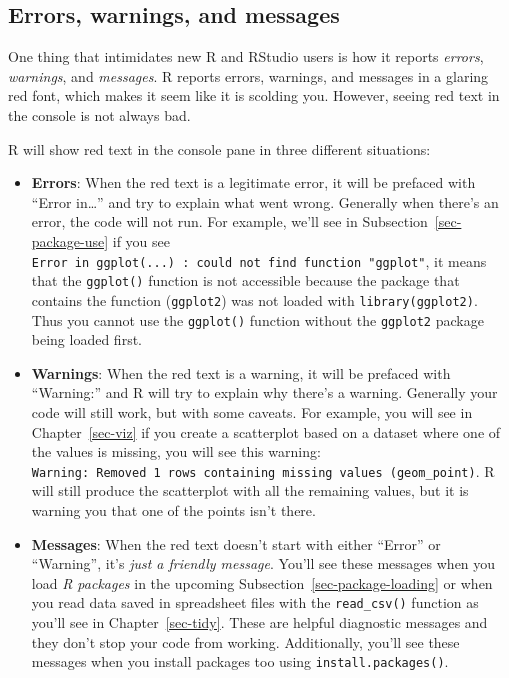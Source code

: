\documentclass[
  letterpaper,
  DIV=11,
  numbers=noendperiod]{scrreprt}
\theoremstyle{definition}
\theoremstyle{remark}
\begin{document}
\hypertarget{errors-warnings-and-messages}{%
\subsection{Errors, warnings, and
messages}\label{errors-warnings-and-messages}}

One thing that intimidates new R and RStudio users is how it reports
\emph{errors}, \emph{warnings}, and \emph{messages}. R reports errors,
warnings, and messages in a glaring red font, which makes it seem like
it is scolding you. However, seeing red text in the console is not
always bad.

R will show red text in the console pane in three different situations:

\begin{itemize}
\item
  \textbf{Errors}: When the red text is a legitimate error, it will be
  prefaced with ``Error in\ldots{}'' and try to explain what went wrong.
  Generally when there's an error, the code will not run. For example,
  we'll see in Subsection~\ref{sec-package-use} if you see
  \texttt{Error\ in\ ggplot(...)\ :\ could\ not\ find\ function\ "ggplot"},
  it means that the \texttt{ggplot()} function is not accessible because
  the package that contains the function (\texttt{ggplot2}) was not
  loaded with \texttt{library(ggplot2)}. Thus you cannot use the
  \texttt{ggplot()} function without the \texttt{ggplot2} package being
  loaded first.
\item
  \textbf{Warnings}: When the red text is a warning, it will be prefaced
  with ``Warning:'' and R will try to explain why there's a warning.
  Generally your code will still work, but with some caveats. For
  example, you will see in Chapter~\ref{sec-viz} if you create a
  scatterplot based on a dataset where one of the values is missing, you
  will see this warning:
  \texttt{Warning:\ Removed\ 1\ rows\ containing\ missing\ values\ (geom\_point)}.
  R will still produce the scatterplot with all the remaining values,
  but it is warning you that one of the points isn't there.
\item
  \textbf{Messages}: When the red text doesn't start with either
  ``Error'' or ``Warning'', it's \emph{just a friendly message}. You'll
  see these messages when you load \emph{R packages} in the upcoming
  Subsection~\ref{sec-package-loading} or when you read data saved in
  spreadsheet files with the \texttt{read\_csv()} function as you'll see
  in Chapter~\ref{sec-tidy}. These are helpful diagnostic messages and
  they don't stop your code from working. Additionally, you'll see these
  messages when you install packages too using
  \texttt{install.packages()}.
\end{itemize}
\end{document}
